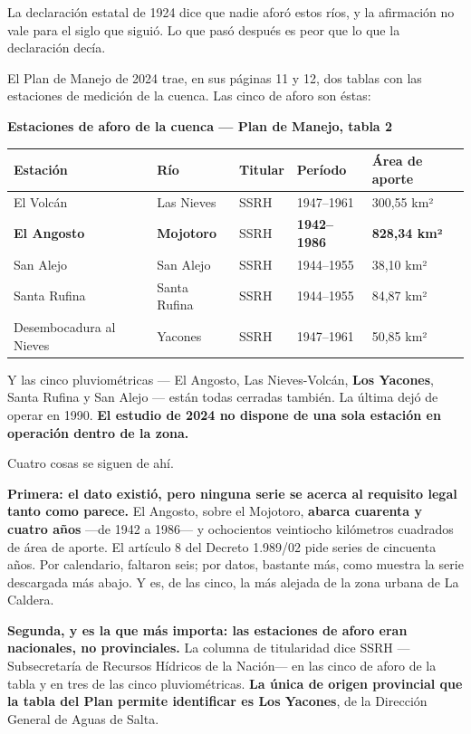 La declaración estatal de 1924 dice que nadie aforó estos ríos, y la afirmación no vale para el siglo que siguió. Lo que pasó después es peor que lo que la declaración decía.

El Plan de Manejo de 2024 trae, en sus páginas 11 y 12, dos tablas con las estaciones de
medición de la cuenca. Las cinco de aforo son éstas:

{\sffamily\bfseries\footnotesize Estaciones de aforo de la cuenca --- Plan de Manejo, tabla 2\par}
\vspace{0.5em}
{\small
\setlength{\LTpre}{0.6em}\setlength{\LTpost}{1.2em}
\begin{longtable}{@{}p{3.9cm}p{2.4cm}p{1.4cm}p{2.0cm}p{2.2cm}@{}}
\toprule
\textbf{Estación} & \textbf{Río} & \textbf{Titular} & \textbf{Período} & \textbf{Área de aporte} \\
\midrule
\endhead
El Volcán & Las Nieves & SSRH & 1947--1961 & 300,55 km² \\
\textbf{El Angosto} & \textbf{Mojotoro} & SSRH & \textbf{1942--1986} & \textbf{828,34 km²} \\
San Alejo & San Alejo & SSRH & 1944--1955 & 38,10 km² \\
Santa Rufina & Santa Rufina & SSRH & 1944--1955 & 84,87 km² \\
Desembocadura al Nieves & Yacones & SSRH & 1947--1961 & 50,85 km² \\
\bottomrule
\end{longtable}
}

Y las cinco pluviométricas --- El Angosto, Las Nieves-Volcán, \textbf{Los Yacones}, Santa
Rufina y San Alejo --- están todas cerradas también. La última dejó de operar en 1990.
\textbf{El estudio de 2024 no dispone de una sola estación en operación dentro de la zona.}

Cuatro cosas se siguen de ahí.

\textbf{Primera: el dato existió, pero ninguna serie se acerca al requisito legal tanto como parece.} El Angosto, sobre el Mojotoro, \textbf{abarca cuarenta y cuatro años} ---de 1942 a 1986--- y ochocientos veintiocho kilómetros cuadrados de área de aporte. El artículo 8 del Decreto 1.989/02 pide series de cincuenta años. Por calendario, faltaron seis; por datos, bastante más, como muestra la serie descargada más abajo. Y es, de las cinco, la más alejada de la zona urbana de La Caldera.

\textbf{Segunda, y es la que más importa: las estaciones de aforo eran nacionales, no provinciales.} La columna de titularidad dice SSRH ---Subsecretaría de Recursos Hídricos de la Nación--- en las cinco de aforo de la tabla y en tres de las cinco pluviométricas. \textbf{La única de origen provincial que la tabla del Plan permite identificar es Los
Yacones}, de la Dirección General de Aguas de Salta.

